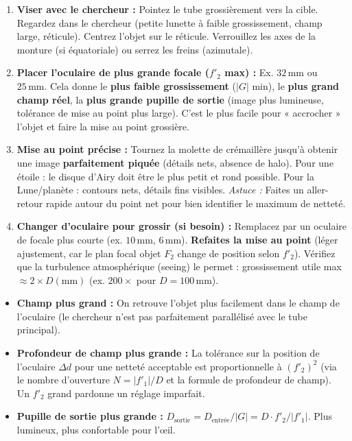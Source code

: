 \documentclass[11pt]{article}
\begin{document}
\begin{methode}
\begin{enumerate}
    \item \textbf{Viser avec le chercheur :} Pointez le tube grossièrement vers la cible. Regardez dans le chercheur (petite lunette à faible grossissement, champ large, réticule). Centrez l'objet sur le réticule. Verrouillez les axes de la monture (si équatoriale) ou serrez les freins (azimutale).
    \item \textbf{Placer l'oculaire de plus grande focale ($f'_2$ max) :} Ex. $32\,\text{mm}$ ou $25\,\text{mm}$. Cela donne le \textbf{plus faible grossissement} ($|G|$ min), le \textbf{plus grand champ réel}, la \textbf{plus grande pupille de sortie} (image plus lumineuse, tolérance de mise au point plus large). C'est le plus facile pour « accrocher » l'objet et faire la mise au point grossière.
    \item \textbf{Mise au point précise :} Tournez la molette de crémaillère jusqu'à obtenir une image \textbf{parfaitement piquée} (détails nets, absence de halo). Pour une étoile : le disque d'Airy doit être le plus petit et rond possible. Pour la Lune/planète : contours nets, détails fins visibles. \emph{Astuce :} Faites un aller-retour rapide autour du point net pour bien identifier le maximum de netteté.
    \item \textbf{Changer d'oculaire pour grossir (si besoin) :} Remplacez par un oculaire de focale plus courte (ex. $10\,\text{mm}$, $6\,\text{mm}$). \textbf{Refaites la mise au point} (léger ajustement, car le plan focal objet $F_2$ change de position selon $f'_2$). Vérifiez que la turbulence atmosphérique (seeing) le permet : grossissement utile max $\approx 2 \times D(\text{mm})$ (ex. $200\times$ pour $D=100\,\text{mm}$).
\end{enumerate}
\end{methode}

\begin{propriete}
\begin{itemize}
    \item \textbf{Champ plus grand :} On retrouve l'objet plus facilement dans le champ de l'oculaire (le chercheur n'est pas parfaitement parallélisé avec le tube principal).
    \item \textbf{Profondeur de champ plus grande :} La tolérance sur la position de l'oculaire $\Delta d$ pour une netteté acceptable est proportionnelle à $(f'_2)^2$ (via le nombre d'ouverture $N = |f'_1|/D$ et la formule de profondeur de champ). Un $f'_2$ grand pardonne un réglage imparfait.
    \item \textbf{Pupille de sortie plus grande :} $D_{\text{sortie}} = D_{\text{entrée}} / |G| = D \cdot f'_2 / |f'_1|$. Plus lumineux, plus confortable pour l'œil.
\end{itemize}
\end{propriete}
\end{document}
